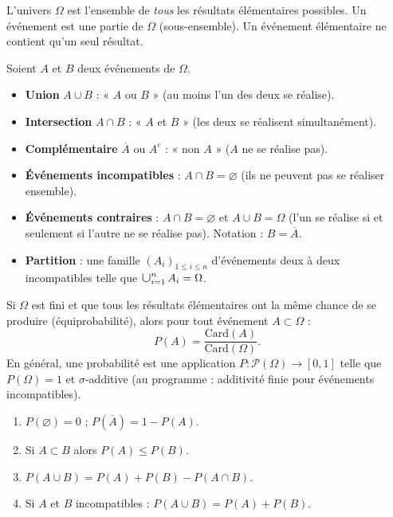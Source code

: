 \documentclass[11pt]{article}
\newcommand{\cle}[1]{{\popxbold\color{popdark}#1}}
\def\bigcup{\mathop{\mathchoice{\raisebox{-0.3em}{\scalebox{1.7}{$\cup$}}}{\scalebox{1.25}{$\cup$}}{\cup}{\cup}}\displaylimits}%
\begin{document}
\begin{definition}
L'\cle{univers} $\Omega$ est l'ensemble de \emph{tous} les résultats élémentaires possibles. Un \cle{événement} est une partie de $\Omega$ (sous-ensemble). Un événement \cle{élémentaire} ne contient qu'un seul résultat.
\end{definition}

\begin{propriete}
Soient $A$ et $B$ deux événements de $\Omega$.
\begin{itemize}
    \item \textbf{Union} $A \cup B$ : « $A$ ou $B$ » (au moins l'un des deux se réalise).
    \item \textbf{Intersection} $A \cap B$ : « $A$ et $B$ » (les deux se réalisent simultanément).
    \item \textbf{Complémentaire} $\overline{A}$ ou $A^c$ : « non $A$ » ($A$ ne se réalise pas).
    \item \textbf{Événements incompatibles} : $A \cap B = \varnothing$ (ils ne peuvent pas se réaliser ensemble).
    \item \textbf{Événements contraires} : $A \cap B = \varnothing$ et $A \cup B = \Omega$ (l'un se réalise si et seulement si l'autre ne se réalise pas). Notation : $B = \overline{A}$.
    \item \textbf{Partition} : une famille $(A_i)_{1 \le i \le n}$ d'événements deux à deux incompatibles telle que $\bigcup_{i=1}^n A_i = \Omega$.
\end{itemize}
\end{propriete}

\begin{definition}
Si $\Omega$ est fini et que tous les résultats élémentaires ont la même chance de se produire (\cle{équiprobabilité}), alors pour tout événement $A \subset \Omega$ :
\[ P(A) = \frac{\text{Card}(A)}{\text{Card}(\Omega)}. \]
En général, une \cle{probabilité} est une application $P : \mathcal{P}(\Omega) \to [0,1]$ telle que $P(\Omega)=1$ et $\sigma$-additive (au programme : additivité finie pour événements incompatibles).
\end{definition}

\begin{propriete}
\begin{enumerate}
    \item $P(\varnothing) = 0$ ; $P(\overline{A}) = 1 - P(A)$.
    \item Si $A \subset B$ alors $P(A) \le P(B)$.
    \item $P(A \cup B) = P(A) + P(B) - P(A \cap B)$.
    \item Si $A$ et $B$ incompatibles : $P(A \cup B) = P(A) + P(B)$.
\end{enumerate}
\end{propriete}
\end{document}
